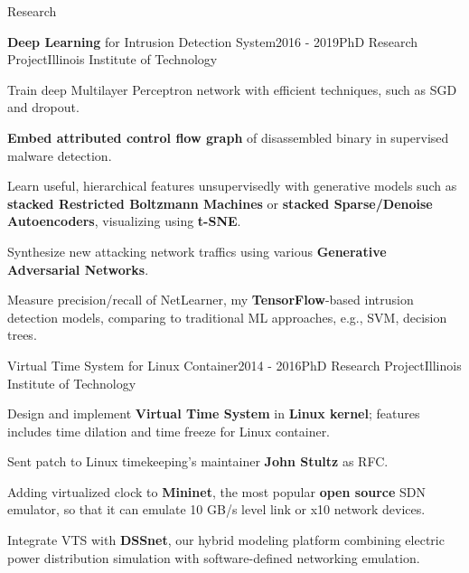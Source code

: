\documentclass{resume} %
\begin{document}

\begin{rSection}{Research}

\begin{rSubsection}{\textbf{Deep Learning} for Intrusion Detection System}{2016 - 2019}{PhD Research Project}{Illinois Institute of Technology}
\item Train deep Multilayer Perceptron network with efficient techniques, such as SGD and dropout.
\item \textbf{Embed attributed control flow graph} of disassembled binary in supervised malware detection.
\item Learn useful, hierarchical features unsupervisedly with generative models such as \textbf{stacked Restricted Boltzmann Machines} or \textbf{stacked Sparse/Denoise Autoencoders}, visualizing using \textbf{t-SNE}.
\item Synthesize new attacking network traffics using various \textbf{Generative Adversarial Networks}.
\item Measure precision/recall of NetLearner, my \textbf{TensorFlow}-based intrusion detection models, comparing to traditional ML approaches, e.g., SVM, decision trees.
\end{rSubsection}

\begin{rSubsection}{Virtual Time System for Linux Container}{2014 - 2016}{PhD Research Project}{Illinois Institute of Technology}
\item Design and implement \textbf{Virtual Time System} in \textbf{Linux kernel}; features includes time dilation and time freeze for Linux container.
\item Sent patch to Linux timekeeping's maintainer \textbf{John Stultz} as RFC.
\item Adding virtualized clock to \textbf{Mininet}, the most popular \textbf{open source} SDN emulator, so that it can emulate 10 GB/s level link or x10 network devices.
\item Integrate VTS with \textbf{DSSnet}, our hybrid modeling platform combining electric power distribution simulation with software-defined networking emulation.
\end{rSubsection}


\end{rSection}
\end{document}
